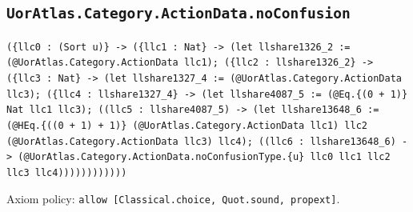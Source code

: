 \documentclass[11pt]{article}
\begin{document}
\subsection*{\texttt{UorAtlas.Category.ActionData.noConfusion}}
\noindent\texttt{(\{llc0 : (Sort u)\} -> (\{llc1 : Nat\} -> (let llshare1326\_2 := (@UorAtlas.Category.ActionData llc1); (\{llc2 : llshare1326\_2\} -> (\{llc3 : Nat\} -> (let llshare1327\_4 := (@UorAtlas.Category.ActionData llc3); (\{llc4 : llshare1327\_4\} -> (let llshare4087\_5 := (@Eq.\{(0 + 1)\} Nat llc1 llc3); ((llc5 : llshare4087\_5) -> (let llshare13648\_6 := (@HEq.\{((0 + 1) + 1)\} (@UorAtlas.Category.ActionData llc1) llc2 (@UorAtlas.Category.ActionData llc3) llc4); ((llc6 : llshare13648\_6) -> (@UorAtlas.Category.ActionData.noConfusionType.\{u\} llc0 llc1 llc2 llc3 llc4))))))))))))}\par
\noindent Axiom policy: \texttt{allow [Classical.choice, Quot.sound, propext]}.\par
\end{document}
